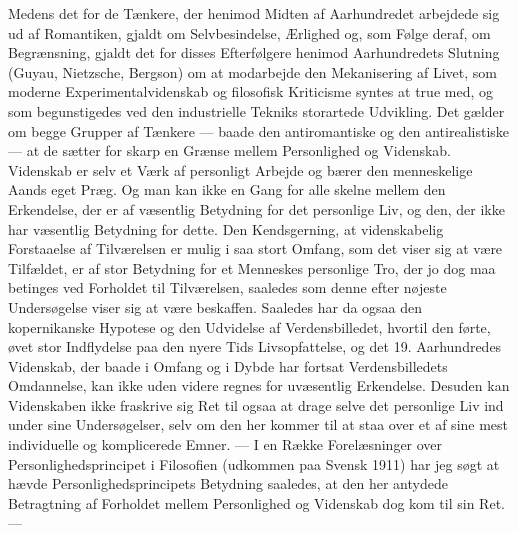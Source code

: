 \documentclass[12pt,a4paper,openany]{book}
\begin{document}
Medens det for de Tænkere, der henimod Midten af Aarhundredet
arbejdede sig ud af Romantiken, gjaldt om Selvbesindelse, Ærlighed
og, som Følge deraf, om Begrænsning, gjaldt det for disses Efterfølgere
henimod Aarhundredets Slutning (Guyau, Nietzsche, Bergson)
om at modarbejde den Mekanisering af Livet, som moderne
Experimentalvidenskab og filosofisk Kriticisme syntes at true med,
og som begunstigedes ved den industrielle Tekniks storartede Udvikling.
Det gælder om begge Grupper af Tænkere --- baade den antiromantiske
og den antirealistiske --- at de sætter for skarp en Grænse
mellem Personlighed og Videnskab. Videnskab er selv et Værk af
personligt Arbejde og bærer den menneskelige Aands eget Præg. Og
man kan ikke en Gang for alle skelne mellem den Erkendelse, der
er af væsentlig Betydning for det personlige Liv, og den, der ikke
har væsentlig Betydning for dette. Den Kendsgerning, at videnskabelig
Forstaaelse af Tilværelsen er mulig i saa stort Omfang, som
det viser sig at være Tilfældet, er af stor Betydning for et Menneskes
personlige Tro, der jo dog maa betinges ved Forholdet til Tilværelsen,
saaledes som denne efter nøjeste Undersøgelse viser sig at være
beskaffen. Saaledes har da ogsaa den kopernikanske Hypotese og
den Udvidelse af Verdensbilledet, hvortil den førte, øvet stor Indflydelse
paa den nyere Tids Livsopfattelse, og det 19. Aarhundredes
Videnskab, der baade i Omfang og i Dybde har fortsat Verdensbilledets
Omdannelse, kan ikke uden videre regnes for uvæsentlig Erkendelse.
Desuden kan Videnskaben ikke fraskrive sig Ret til ogsaa
at drage selve det personlige Liv ind under sine Undersøgelser, selv
om den her kommer til at staa over et af sine mest individuelle og
komplicerede Emner. --- I en Række Forelæsninger over Personlighedsprincipet
i Filosofien (udkommen paa Svensk 1911) har jeg søgt
at hævde Personlighedsprincipets Betydning saaledes, at den her antydede
Betragtning af Forholdet mellem Personlighed og Videnskab
dog kom til sin Ret. ---
\end{document}
